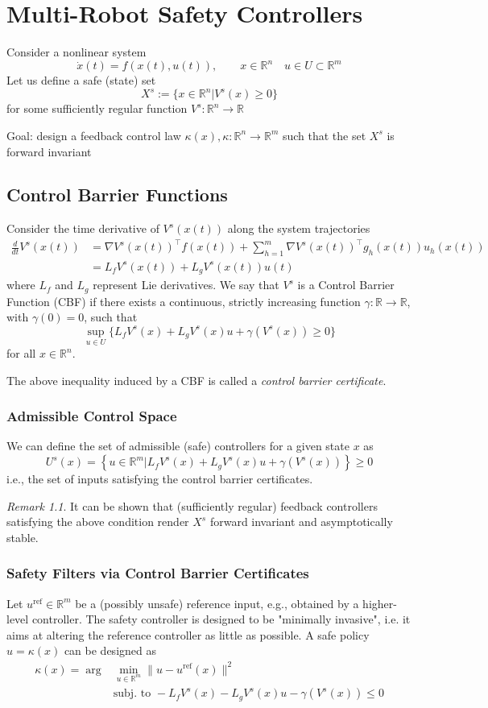 \documentclass{book}
\newcommand{\R}{\mathbb{R}}
\theoremstyle{theoremv2}
\theoremstyle{defv2}
\theoremstyle{remark}
\newtheorem*{remark}{Remark}
\theoremstyle{remark}
\theoremstyle{definition}
\theoremstyle{definition}
\begin{document}
\chapter{Multi-Robot Safety Controllers}
Consider a nonlinear system 
\[
    \dot{x}(t) = f(x(t),u(t)), \qquad x\in\R^n \quad u\in U\subset \R^m
\]
Let us define a safe (state) set 
\[
    X^s := \{ x\in\R^n | V^s(x)\geq0 \}
\]
for some sufficiently regular function $V^s:\R^n\to\R$

Goal: design a feedback control law $\kappa(x),\kappa:\R^n\to\R^m$ such that the set $X^s$ is forward invariant

\section{Control Barrier Functions}
Consider the time derivative of $V^s(x(t))$ along the system trajectories
\begin{align*}
    \displaystyle\frac{d}{dt}V^s(x(t)) &= \nabla V^s(x(t))^\top f(x(t)) + \displaystyle\sum_{h=1}^{m}\nabla V^s(x(t))^\top g_h(x(t))u_h(x(t))\\
                                       &= L_fV^s(x(t)) + L_gV^s(x(t))u(t)
\end{align*}
where $L_f$ and $L_g$ represent Lie derivatives.
We say that $V^s$ is a Control Barrier Function (CBF) if there exists a continuous, strictly increasing function $\gamma:\R\to\R$, with $\gamma(0)=0$, such that 
\[
    \sup_{u\in U}\{ L_fV^s(x) + L_gV^s(x)u + \gamma(V^s(x))\geq 0 \}
\]
for all $x\in\R^n$.

The above inequality induced by a CBF is called a \emph{control barrier certificate}.
\subsection{Admissible Control Space}
We can define the set of admissible (safe) controllers for a given state $x$ as 
\[
    U^s(x) = \left\{ u\in\R^m | L_fV^s(x) + L_gV^s(x)u + \gamma(V^s(x)) \right\}\geq 0
\]
i.e., the set of inputs satisfying the control barrier certificates. 
\begin{remark}
    It can be shown that (sufficiently regular) feedback controllers satisfying the above condition render $X^s$ forward invariant and asymptotically stable.
\end{remark}

\subsection{Safety Filters via Control Barrier Certificates}
Let $u^\text{ref}\in\R^m$ be a (possibly unsafe) reference input, e.g., obtained by a higher-level controller. The safety controller is designed to be "minimally invasive", i.e. it aims at altering the reference controller as little as possible. A safe policy $u = \kappa(x)$ can be designed as 
\begin{align*}
    \kappa(x) = \arg &\min_{u\in\R^m} \|u-u^\text{ref}(x)\|^2\\
                     &\text{subj. to } -L_fV^s(x) - L_gV^s(x)u - \gamma(V^s(x))\leq 0
\end{align*}
\end{document}
